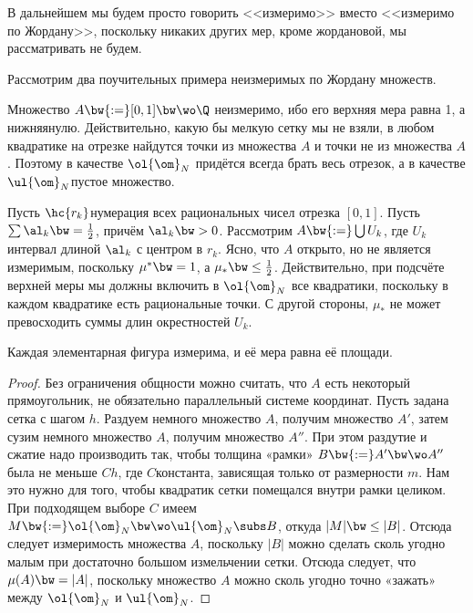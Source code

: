 \documentclass[a4paper]{article}
\begin{document}
\begin{note}
В дальнейшем мы будем просто говорить <<измеримо>> вместо <<измеримо по Жордану>>, поскольку
никаких других мер, кроме жордановой, мы рассматривать не будем.
\end{note}

Рассмотрим два поучительных примера неизмеримых по Жордану множеств.

\begin{ex}
Множество $A\bw{:=}[0,1] \bw\wo \Q$ неизмеримо, ибо его верхняя мера равна 1, а нижняя\т нулю.
Действительно, какую бы мелкую сетку мы не взяли, в любом квадратике на отрезке найдутся точки из
множества $A$ и точки не из множества $A$. Поэтому в качестве $\ol{\om}_N$ придётся всегда брать
весь отрезок, а в качестве $\ul{\om}_N$\т пустое множество.
\end{ex}

\begin{ex}
Пусть $\hc{r_k}$\т нумерация всех рациональных чисел отрезка $[0,1]$. Пусть $\sum \al_k \bw=
\frac{1}{2}$, причём $\al_k \bw> 0$. Рассмотрим $A\bw{:=}\bigcup U_k$, где $U_k$\т интервал длиной
$\al_k$ с центром в $r_k$. Ясно, что $A$ открыто, но не является измеримым, поскольку $\mu^* \bw= 1$,
а $\mu_*\bw\le \frac{1}{2}$. Действительно, при подсчёте верхней меры мы должны включить в
$\ol{\om}_N$ все квадратики, поскольку в каждом квадратике есть рациональные точки. С другой
стороны, $\mu_*$ не может превосходить суммы длин окрестностей $U_k$.
\end{ex}

\begin{theorem}
Каждая элементарная фигура измерима, и её мера равна её площади.
\end{theorem}
\begin{proof}
Без ограничения общности можно считать, что $A$ есть некоторый прямоугольник, не обязательно
параллельный системе координат. Пусть задана сетка с шагом $h$. Раздуем немного множество $A$,
получим множество $A'$, затем сузим немного множество $A$, получим множество $A''$. При этом
раздутие и сжатие надо производить так, чтобы толщина «рамки» $B \bw{:=}A' \bw\wo A''$ была не меньше
$Ch$, где $C$\т константа, зависящая только от размерности $m$. Нам это нужно для того, чтобы
квадратик сетки помещался внутри рамки целиком. При подходящем выборе $C$ имеем $M
\bw{:=}\ol{\om}_N \bw\wo \ul{\om}_N \subs B$, откуда $|M| \bw\le |B|$. Отсюда следует измеримость
множества $A$, поскольку $|B|$ можно сделать сколь угодно малым при достаточно большом измельчении
сетки. Отсюда следует, что $\mu(A) \bw= |A|$, поскольку множество $A$ можно сколь угодно точно
«зажать» между $\ol{\om}_N$ и $\ul{\om}_N$.
\end{proof}
\end{document}
